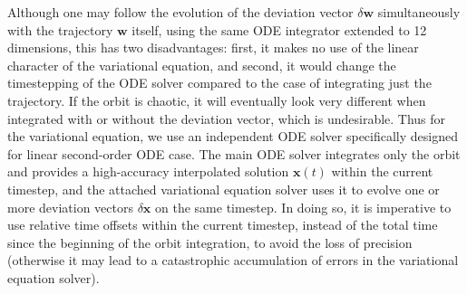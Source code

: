 \documentclass[12pt]{article}
\newcommand{\bx}{\boldsymbol{x}}
\begin{document}
Although one may follow the evolution of the deviation vector $\delta\boldsymbol{w}$ simultaneously with the trajectory $\boldsymbol{w}$ itself, using the same ODE integrator extended to 12 dimensions, this has two disadvantages: first, it makes no use of the linear character of the variational equation, and second, it would change the timestepping of the ODE solver compared to the case of integrating just the trajectory. If the orbit is chaotic, it will eventually look very different when integrated with or without the deviation vector, which is undesirable. Thus for the variational equation, we use an independent ODE solver specifically designed for linear second-order ODE case. The main ODE solver integrates only the orbit and provides a high-accuracy interpolated solution $\bx(t)$ within the current timestep, and the attached variational equation solver uses it to evolve one or more deviation vectors $\delta\bx$ on the same timestep. In doing so, it is imperative to use relative time offsets within the current timestep, instead of the total time since the beginning of the orbit integration, to avoid the loss of precision (otherwise it may lead to a catastrophic accumulation of errors in the variational equation solver).
\end{document}
